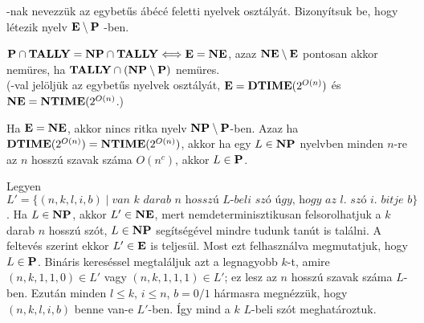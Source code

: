\begin{Exercise}[counter={sorszam}, difficulty=0]
	\TALLY-nak nevezzük az egybetűs ábécé feletti nyelvek osztályát. Bizonyítsuk be, hogy létezik \TALLY nyelv $\E \setminus \P$ -ben.
\end{Exercise}



\begin{Exercise}[counter={sorszam}, difficulty=0]
	$\P\cap\TALLY=\NP\cap\TALLY \Longleftrightarrow\E=\NE$, azaz $\NE \setminus \E$ pontosan akkor nemüres, ha $\TALLY \cap (\NP \setminus \P)$ nemüres.\\
	(\TALLY-val jelöljük az egybet\H us nyelvek osztályát, $\E=\DTIME(2^{O(n)})$ \'es $\NE=\NTIME(2^{O(n)}$.)
\end{Exercise}



\begin{Exercise}[counter={sorszam}, difficulty=1]
	Ha $\E=\NE$, akkor nincs ritka nyelv $\NP\setminus \P$-ben. Azaz ha $\DTIME(2^{O(n)})=\NTIME(2^{O(n)})$, akkor ha egy $L\in \NP$ nyelvben minden $n$-re az $n$ hossz\'u szavak sz\'ama $O(n^c)$, akkor $L\in \P$.
\end{Exercise}	
\begin{Answer}
	Legyen $L'=\{(n,k,l,i,b)\mid \textit{van k darab n hossz\'u L-beli sz\'o \'ugy, hogy az l.\ sz\'o i.\ bitje b}\}$.
	Ha $L\in \NP$, akkor $L'\in \NE$, mert nemdeterminisztikusan felsorolhatjuk a $k$ darab $n$ hossz\'u sz\'ot, $L\in \NP$ seg\'its\'eg\'evel mindre tudunk tan\'ut is tal\'alni.
	A feltev\'es szerint ekkor $L'\in \E$ is teljes\"ul.
	Most ezt felhaszn\'alva megmutatjuk, hogy $L\in \P$.
	Bin\'aris keres\'essel megtal\'aljuk azt a legnagyobb $k$-t, amire $(n,k,1,1,0)\in L'$ vagy $(n,k,1,1,1)\in L'$; ez lesz az $n$ hossz\'u szavak sz\'ama $L$-ben.
	Ezut\'an minden $l\le k$, $i\le n$, $b=0/1$ h\'armasra megn\'ezz\"uk, hogy $(n,k,l,i,b)$ benne van-e $L'$-ben.
	\'Igy mind a $k$ $L$-beli sz\'ot meghat\'aroztuk.
\end{Answer}

